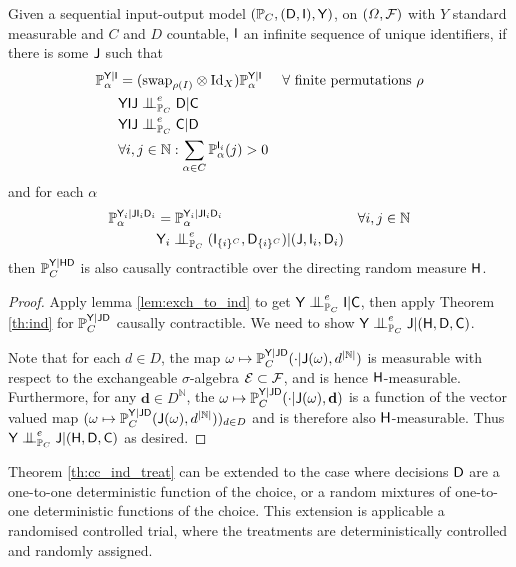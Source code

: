 \begin{theorem}\label{th:cc_ind_treat}
Given a sequential input-output model $(\mathbb{P}_C,(\mathsf{D},\mathsf{I}),\mathsf{Y})$, on $(\Omega,\mathcal{F})$ with $Y$ standard measurable and $C$ and $D$ countable, $\mathsf{I}$ an infinite sequence of unique identifiers, if there is some $\mathsf{J}$ such that
\begin{align}
    \prob{P}_\alpha^{\RV{Y}|\RV{I}} &= (\text{swap}_{\rho(I)}\otimes \text{Id}_X )\prob{P}_\alpha^{\RV{Y}|\RV{I}}&\forall \text{ finite permutations }\rho\\
    &\RV{YIJ}\CI^e_{\prob{P}_C} \RV{D}|\RV{C}\\
    &\RV{YIJ}\CI^e_{\prob{P}_C} \RV{C}|\RV{D}\\
    &\forall i,j\in \mathbb{N}: \sum_{\alpha\in C} \prob{P}_\alpha^{\RV{I}_i}(j)>0
\end{align}
and for each $\alpha$
\begin{align}
    \prob{P}_\alpha^{\RV{Y}_i|\RV{J}\RV{I}_i\RV{D}_i} &= \prob{P}_\alpha^{\RV{Y}_i|\RV{J}\RV{I}_i\RV{D}_i} &\forall i,j\in \mathbb{N}\\
    &\RV{Y}_i\CI^e_{\prob{P}_C} (\RV{I}_{\{i\}^C},\RV{D}_{\{i\}^C})|(\RV{J},\RV{I}_i,\RV{D}_i)
\end{align}
then $\mathbb{P}_C^{\mathsf{Y}|\mathsf{HD}}$ is also causally contractible over the directing random measure $\mathsf{H}$.
\end{theorem}

\begin{proof}
Apply lemma \ref{lem:exch_to_ind} to get $\RV{Y}\CI^e_{\prob{P}_C} \RV{I} | \RV{C}$, then apply Theorem \ref{th:ind} for $\mathbb{P}_C^{\mathsf{Y}|\mathsf{J}\mathsf{D}}$ causally contractible. We need to show $\RV{Y}\CI^e_{\prob{P}_C} \RV{J}|(\RV{H},\RV{D},\RV{C})$.

Note that for each $d\in D$, the map $\omega\mapsto \mathbb{P}_C^{\mathsf{Y}|\mathsf{JD}}(\cdot|\mathsf{J}(\omega),d^{|\mathbb{N}|})$ is measurable with respect to the exchangeable $\sigma$-algebra $\mathcal{E}\subset\mathcal{F}$, and is hence $\mathsf{H}$-measurable. Furthermore, for any $\mathbf{d}\in D^{\mathbb{N}}$, the $\omega\mapsto \mathbb{P}_C^{\mathsf{Y}|\mathsf{JD}}(\cdot|\mathsf{J}(\omega),\mathbf{d})$ is a function of the vector valued map $(\omega\mapsto \mathbb{P}_C^{\mathsf{Y}|\mathsf{JD}}(\mathsf{J}(\omega),d^{|\mathbb{N}|}))_{d\in D}$ and is therefore also $\mathsf{H}$-measurable. Thus $\RV{Y}\CI^e_{\prob{P}_C} \RV{J}|(\RV{H},\RV{D},\RV{C})$ as desired.
\end{proof}

Theorem \ref{th:cc_ind_treat} can be extended to the case where decisions $\mathsf{D}$ are a one-to-one deterministic function of the choice, or a random mixtures of one-to-one deterministic functions of the choice. This extension is applicable a randomised controlled trial, where the treatments are deterministically controlled and randomly assigned.

